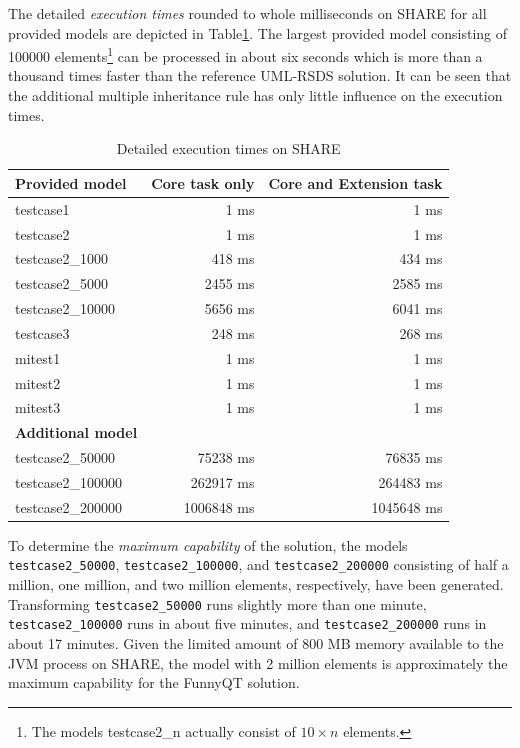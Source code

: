 \documentclass[11pt]{article}
\begin{document}
The detailed \emph{execution times} rounded to whole milliseconds on SHARE for
all provided models are depicted in Table\ref{tab:exec-times}.  The largest
provided model consisting of 100000 elements\footnote{The models
  \textsf{testcase2\_n} actually consist of $10\times n$ elements.} can be
processed in about six seconds which is more than a thousand times faster than
the reference UML-RSDS solution.  It can be seen that the additional multiple
inheritance rule has only little influence on the execution times.

\begin{table}[htb]
  \centering
  \begin{tabular}{| l | r | r |}
    \hline
    \textbf{Provided model}    & \textbf{Core task only} & \textbf{Core and Extension task}\\
    \hline
    \textsf{testcase1}         & 1 ms      & 1 ms\\
    \textsf{testcase2}         & 1 ms      & 1 ms\\
    \textsf{testcase2\_1000}   & 418 ms    & 434 ms\\
    \textsf{testcase2\_5000}   & 2455 ms   & 2585 ms\\
    \textsf{testcase2\_10000}  & 5656 ms   & 6041 ms\\
    \textsf{testcase3}         & 248 ms    & 268 ms\\
    \hline
    \textsf{mitest1}           & 1 ms      & 1 ms\\
    \textsf{mitest2}           & 1 ms      & 1 ms\\
    \textsf{mitest3}           & 1 ms      & 1 ms\\
    \hline
    \textbf{Additional model}  & & \\
    \hline
    \textsf{testcase2\_50000}  & 75238 ms  & 76835 ms\\
    \textsf{testcase2\_100000} & 262917 ms & 264483 ms\\
    \textsf{testcase2\_200000} & 1006848 ms & 1045648 ms\\
    \hline
  \end{tabular}
  \caption{Detailed execution times on SHARE}
  \label{tab:exec-times}
\end{table}

\begin{sloppypar}
  To determine the \emph{maximum capability} of the solution, the models
  \verb|testcase2_50000|, \verb|testcase2_100000|, and \verb|testcase2_200000|
  consisting of half a million, one million, and two million elements,
  respectively, have been generated.  Transforming \verb|testcase2_50000| runs
  slightly more than one minute, \verb|testcase2_100000| runs in about five
  minutes, and \verb|testcase2_200000| runs in about 17 minutes.  Given the
  limited amount of 800 MB memory available to the JVM process on SHARE, the
  model with 2 million elements is approximately the maximum capability for the
  FunnyQT solution.
\end{sloppypar}




\end{document}
